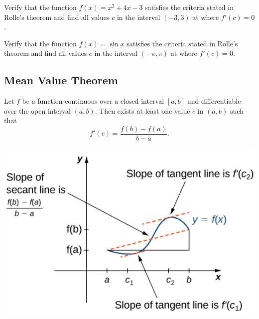 \begin{example}

Verify that the function \(f(x)=x^2+4x-3\) satisfies the criteria stated
in Rolle's theorem and find all values \(c\) in the interval \((-3, 3)\)
at where \(f'(c)=0\).

\end{example}
\vspace*{6\baselineskip}

\begin{example}

Verify that the function \(f(x)=\sin x\) satisfies the criteria stated
in Rolle's theorem and find all values \(c\) in the interval
\((-\pi, \pi)\) at where \(f'(c)=0\).

\end{example}
\vspace*{6\baselineskip}

\hypertarget{mean-value-theorem-1}{%
\subsection{Mean Value Theorem}\label{mean-value-theorem-1}}

\begin{theorem}

Let \(f\) be a function continuous over a closed interval \([a,b]\) and
differentiable over the open interval \((a,b)\). Then exists at least
one value \(c\) in \((a,b)\) such that \[f'(c)=\frac{f(b)-f(a)}{b-a}.\]
\begin{fullwidth}
  \centering
  \includegraphics[scale=0.4]{img/image-20200323192552917.png}
\end{fullwidth}

\end{theorem}

